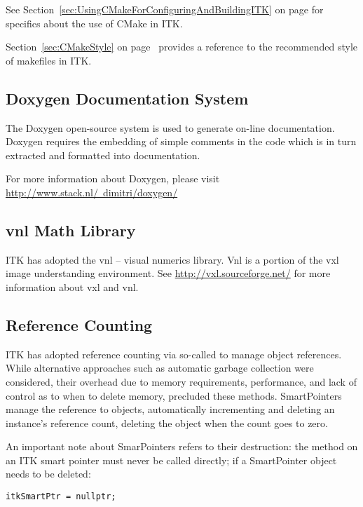 See Section~\ref{sec:UsingCMakeForConfiguringAndBuildingITK} on page
\pageref{sec:UsingCMakeForConfiguringAndBuildingITK} for specifics about the use
of CMake in ITK.

Section~\ref{sec:CMakeStyle} on page~\pageref{sec:CMakeStyle} provides a
reference to the recommended style of makefiles in ITK.

\subsection{Doxygen Documentation System}
\label{subsec:DoxygenDocumentationSystem}

The Doxygen open-source system is used to generate on-line documentation.
Doxygen requires the embedding of simple comments in the code which is in turn
extracted and formatted into documentation.

For more information about Doxygen, please visit
\href{http://www.stack.nl/~dimitri/doxygen/}{http://www.stack.nl/~dimitri/doxygen/}

\subsection{vnl Math Library}
\label{subsec:vnlMathLibrary}

ITK has adopted the vnl -- visual numerics library. Vnl is a portion of the vxl image
understanding environment. See \href{http://vxl.sourceforge.net/}{http://vxl.sourceforge.net/}
for more information about vxl and vnl.


\subsection{Reference Counting}
\label{subsec:ReferenceCounting}

ITK has adopted reference counting via so-called  to
manage object references. While alternative approaches such as automatic garbage
collection were considered, their overhead due to memory requirements,
performance, and lack of control as to when to delete memory, precluded these
methods. SmartPointers manage the reference to objects, automatically
incrementing and deleting an instance's reference count, deleting the object
when the count goes to zero.

An important note about SmarPointers refers to their destruction: the
 method on an ITK smart pointer must never be called directly; if
a SmartPointer object  needs to be deleted:
\small
\begin{verbatim}
itkSmartPtr = nullptr;
\end{verbatim}
\normalsize

